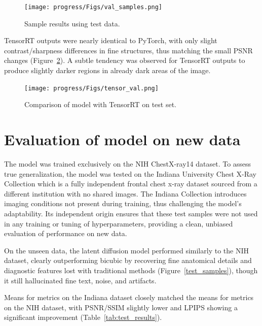 \documentclass{article} %
\begin{document}
\begin{figure}[h]
\begin{center}
\texttt{[image: progress/Figs/val\_samples.png]}
\end{center}
\caption{Sample results using test data.}
\label{val_samples}
\end{figure}

TensorRT outputs were nearly identical to PyTorch, with only slight contrast/sharpness differences in fine structures, thus matching the small PSNR changes (Figure~\ref{tensor_val}). A subtle tendency was observed for TensorRT outputs to produce slightly darker regions in already dark areas of the image.

\begin{figure}[h]
\begin{center}
\texttt{[image: progress/Figs/tensor\_val.png]}
\end{center}
\caption{Comparison of model with TensorRT on test set.}
\label{tensor_val}
\end{figure}

\section{Evaluation of model on new data}

\renewcommand{\arraystretch}{1.3}

The model was trained exclusively on the NIH ChestX-ray14 dataset. To assess true generalization, the model was tested on the Indiana University Chest X-Ray Collection which is a fully independent frontal chest x-ray dataset sourced from a different institution with no shared images. The Indiana Collection introduces imaging conditions not present during training, thus challenging the model’s adaptability. Its independent origin ensures that these test samples were not used in any training or tuning of hyperparameters, providing a clean, unbiased evaluation of performance on new data.

On the unseen data, the latent diffusion model performed similarly to the NIH dataset, clearly outperforming bicubic by recovering fine anatomical details and diagnostic features lost with traditional methods (Figure~\ref{test_samples}), though it still hallucinated fine text, noise, and artifacts.

Means for metrics on the Indiana dataset closely matched the means for metrics on the NIH dataset, with PSNR/SSIM slightly lower and LPIPS showing a significant improvement (Table~\ref{tab:test_results}).
\end{document}
